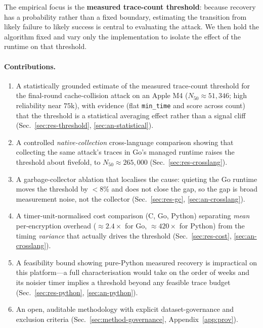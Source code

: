 \documentclass[11pt]{article}
\begin{document}
The empirical focus is the \textbf{measured trace-count threshold}: because
recovery has a probability rather than a fixed boundary, estimating the
transition from likely failure to likely success is central to evaluating the
attack. We then hold the algorithm fixed and vary only the implementation to
isolate the effect of the runtime on that threshold.

\paragraph{Contributions.}
\begin{enumerate}
  \item A statistically grounded estimate of the measured trace-count threshold
        for the final-round cache-collision attack on an Apple M4
        ($N_{50}\approx 51{,}346$; high reliability near $75$k), with evidence
        (flat \texttt{min\_time} and score across count) that the threshold is a
        statistical averaging effect rather than a signal cliff
        (Sec.~\ref{sec:res-threshold}, \ref{sec:an-statistical}).
  \item A controlled \emph{native-collection} cross-language comparison showing
        that collecting the same attack's traces in Go's managed runtime raises
        the threshold about fivefold, to $N_{50}\approx 265{,}000$
        (Sec.~\ref{sec:res-crosslang}).
  \item A garbage-collector ablation that localises the cause: quieting the Go
        runtime moves the threshold by $<8\%$ and does not close the gap, so the
        gap is broad measurement noise, not the collector
        (Sec.~\ref{sec:res-gc}, \ref{sec:an-crosslang}).
  \item A timer-unit-normalised cost comparison (C, Go, Python) separating
        \emph{mean} per-encryption overhead ($\approx 2.4\times$ for Go,
        $\approx 420\times$ for Python) from the timing \emph{variance} that
        actually drives the threshold (Sec.~\ref{sec:res-cost},
        \ref{sec:an-crosslang}).
  \item A feasibility bound showing pure-Python measured recovery is impractical
        on this platform---a full characterisation would take on the order of
        weeks and its noisier timer implies a threshold beyond any feasible
        trace budget (Sec.~\ref{sec:res-python}, \ref{sec:an-python}).
  \item An open, auditable methodology with explicit dataset-governance and
        exclusion criteria (Sec.~\ref{sec:method-governance}, Appendix~\ref{app:prov}).
\end{enumerate}
\end{document}
